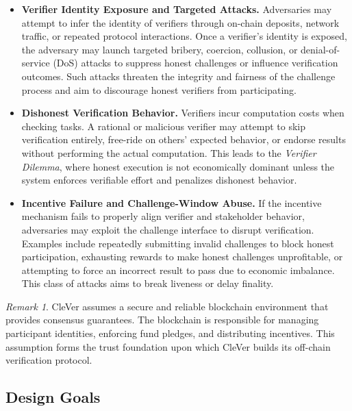 \documentclass[3p]{elsarticle}
\theoremstyle{remark}
\newtheorem*{remark}{Remark}
\begin{document}
\begin{itemize}
    \item \textbf{Verifier Identity Exposure and Targeted Attacks.} Adversaries may attempt to infer the identity of verifiers through on-chain deposits, network traffic, or repeated protocol interactions. Once a verifier's identity is exposed, the adversary may launch targeted bribery, coercion, collusion, or denial-of-service (DoS) attacks to suppress honest challenges or influence verification outcomes. Such attacks threaten the integrity and fairness of the challenge process and aim to discourage honest verifiers from participating.

    \item \textbf{Dishonest Verification Behavior.} Verifiers incur computation costs when checking tasks. A rational or malicious verifier may attempt to skip verification entirely, free-ride on others' expected behavior, or endorse results without performing the actual computation. This leads to the \emph{Verifier Dilemma}, where honest execution is not economically dominant unless the system enforces verifiable effort and penalizes dishonest behavior.

    \item \textbf{Incentive Failure and Challenge-Window Abuse.} If the incentive mechanism fails to properly align verifier and stakeholder behavior, adversaries may exploit the challenge interface to disrupt verification. Examples include repeatedly submitting invalid challenges to block honest participation, exhausting rewards to make honest challenges unprofitable, or attempting to force an incorrect result to pass due to economic imbalance. This class of attacks aims to break liveness or delay finality.
\end{itemize}

\begin{remark}
CleVer assumes a secure and reliable blockchain environment that provides consensus guarantees. The blockchain is responsible for managing participant identities, enforcing fund pledges, and distributing incentives. This assumption forms the trust foundation upon which CleVer builds its off-chain verification protocol.
\end{remark}


\subsection{Design Goals}
\end{document}
